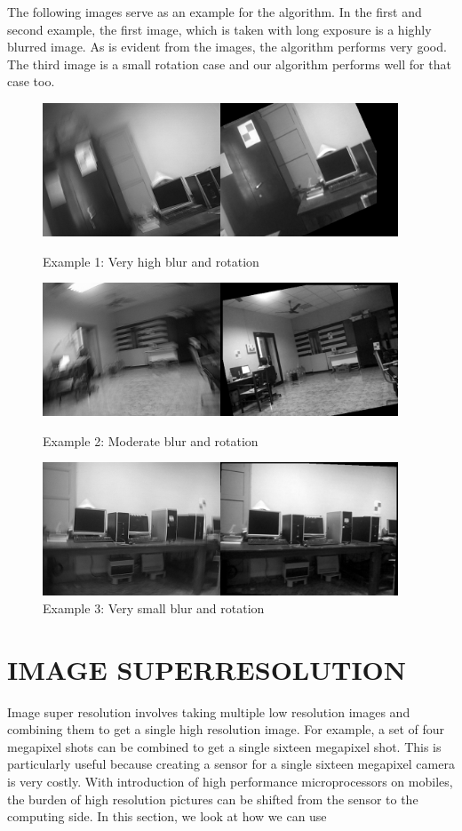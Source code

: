 \documentclass[BTech]{iitmdiss}
\begin{document}
The following images serve as an example for the algorithm. In the first
and second example, the first image, which is taken with long exposure
is a highly blurred image. As is evident from the images, the algorithm
performs very good. The third image is a small rotation case and our
algorithm performs well for that case too.

\begin{figure}[ht]
\begin{center}
\includegraphics[width=300pt]{images/imreg/rotation/eg1/imreg.png}
\caption{Example 1: Very high blur and rotation}
\includegraphics[width=300pt]{images/imreg/rotation/eg2/imreg.png}
\caption{Example 2: Moderate blur and rotation}
\includegraphics[width=300pt]{images/imreg/rotation/eg3/imreg.png}
\caption{Example 3: Very small blur and rotation}
\end{center}
\end{figure}

\pagebreak
\chapter{IMAGE SUPERRESOLUTION}
\label{chap:image_superresolution}
Image super resolution involves taking multiple low resolution images
and combining them to get a single high resolution image. For example,
a set of four megapixel shots can be combined to get a single sixteen
megapixel shot. This is particularly useful because creating a sensor 
for a single sixteen megapixel camera is very costly. With introduction
of high performance microprocessors on mobiles, the burden of high 
resolution pictures can be shifted from the sensor to the computing side.
In this section, we look at how we can use 
\pagebreak
\end{document}
